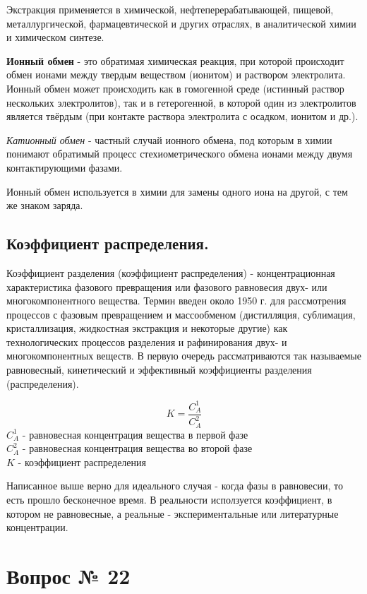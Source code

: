 \documentclass[14pt,a4paper]{scrartcl}
\begin{document}
Экстракция применяется в химической, нефтеперерабатывающей, пищевой, металлургической, фармацевтической и других отраслях, в аналитической химии и химическом синтезе.

\textbf{Ионный обмен} - это обратимая химическая реакция, при которой происходит обмен ионами между твердым веществом (ионитом) и раствором электролита. Ионный обмен может происходить как в гомогенной среде (истинный раствор нескольких электролитов), так и в гетерогенной, в которой один из электролитов является твёрдым (при контакте раствора электролита с осадком, ионитом и др.).

\emph{Катионный обмен} - частный случай ионного обмена, под которым в химии понимают обратимый процесс стехиометрического обмена ионами между двумя контактирующими фазами.

Ионный обмен используется в химии для замены одного иона на другой, с тем же знаком заряда.
\subsection*{Коэффициент распределения.}

Коэффициент разделения (коэффициент распределения) - концентрационная характеристика фазового превращения или фазового равновесия двух- или многокомпонентного вещества. Термин введен около 1950 г. для рассмотрения процессов с фазовым превращением и массообменом (дистилляция, сублимация, кристаллизация, жидкостная экстракция и некоторые другие) как технологических процессов разделения и рафинирования двух- и многокомпонентных веществ. В первую очередь рассматриваются так называемые равновесный, кинетический и эффективный коэффициенты разделения (распределения).

$$K = \frac{C_A^1}{C_A^2}$$
$C_A^1$ - равновесная концентрация вещества в первой фазе\\
$C_A^2$ - равновесная концентрация вещества во второй фазе\\
$K$ - коэффициент распределения

Написанное выше верно для идеального случая - когда фазы в равновесии, то есть прошло бесконечное время. В реальности исползуется коэффициент, в котором не равновесные, а реальные - экспериментальные или литературные концентрации.


\section*{Вопрос № 22}
\end{document}
